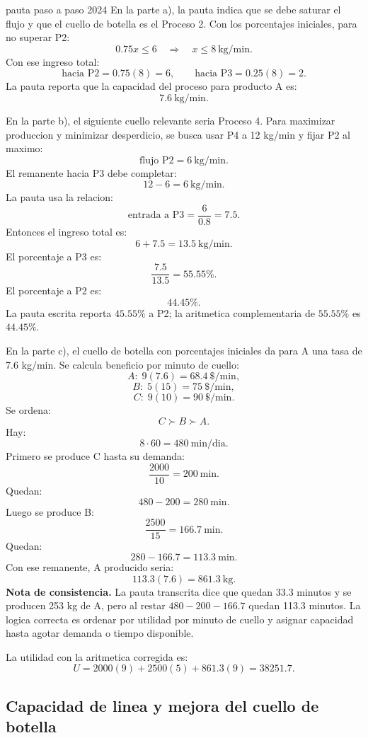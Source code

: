 \begin{pautacompleta}{pauta paso a paso 2024}
En la parte a), la pauta indica que se debe saturar el flujo y que el cuello de botella es el Proceso 2. Con los porcentajes iniciales, para no superar P2:
\[
  0.75x\leq 6\quad\Rightarrow\quad x\leq 8\ \text{kg/min}.
\]
Con ese ingreso total:
\[
  \text{hacia P2}=0.75(8)=6,
  \qquad
  \text{hacia P3}=0.25(8)=2.
\]
La pauta reporta que la capacidad del proceso para producto A es:
\[
  7.6\ \text{kg/min}.
\]

En la parte b), el siguiente cuello relevante seria Proceso 4. Para maximizar produccion y minimizar desperdicio, se busca usar P4 a 12 kg/min y fijar P2 al maximo:
\[
  \text{flujo P2}=6\ \text{kg/min}.
\]
El remanente hacia P3 debe completar:
\[
  12-6=6\ \text{kg/min}.
\]
La pauta usa la relacion:
\[
  \text{entrada a P3}=\frac{6}{0.8}=7.5.
\]
Entonces el ingreso total es:
\[
  6+7.5=13.5\ \text{kg/min}.
\]
El porcentaje a P3 es:
\[
  \frac{7.5}{13.5}=55.55\%.
\]
El porcentaje a P2 es:
\[
  44.45\%.
\]
La pauta escrita reporta $45.55\%$ a P2; la aritmetica complementaria de $55.55\%$ es $44.45\%$.

En la parte c), el cuello de botella con porcentajes iniciales da para A una tasa de 7.6 kg/min. Se calcula beneficio por minuto de cuello:
\[
  A:\;9(7.6)=68.4\ \$/\text{min},
\]
\[
  B:\;5(15)=75\ \$/\text{min},
\]
\[
  C:\;9(10)=90\ \$/\text{min}.
\]
Se ordena:
\[
  C\succ B\succ A.
\]
Hay:
\[
  8\cdot 60=480\ \text{min/dia}.
\]
Primero se produce C hasta su demanda:
\[
  \frac{2000}{10}=200\ \text{min}.
\]
Quedan:
\[
  480-200=280\ \text{min}.
\]
Luego se produce B:
\[
  \frac{2500}{15}=166.7\ \text{min}.
\]
Quedan:
\[
  280-166.7=113.3\ \text{min}.
\]
Con ese remanente, A producido seria:
\[
  113.3(7.6)=861.3\ \text{kg}.
\]
\textbf{Nota de consistencia.} La pauta transcrita dice que quedan 33.3 minutos y se producen 253 kg de A, pero al restar $480-200-166.7$ quedan 113.3 minutos. La logica correcta es ordenar por utilidad por minuto de cuello y asignar capacidad hasta agotar demanda o tiempo disponible.

La utilidad con la aritmetica corregida es:
\[
  U=2000(9)+2500(5)+861.3(9)=38251.7.
\]
\end{pautacompleta}

\subsection{Capacidad de linea y mejora del cuello de botella}

